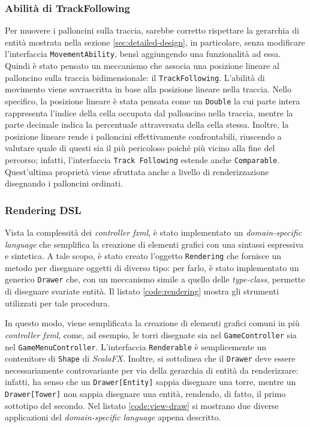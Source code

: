 \subsubsection{Abilità di TrackFollowing}
Per muovere i palloncini sulla traccia, sarebbe corretto rispettare la gerarchia di entità mostrata nella sezione
\ref{sec:detailed-design}, in particolare, senza modificare l'interfaccia \texttt{MovementAbility}, bensì aggiungendo una
funzionalità ad essa. Quindi è stato pensato un meccanismo che associa una posizione lineare al palloncino sulla
traccia bidimensionale: il \texttt{TrackFollowing}. L'abilità di movimento viene sovrascritta in base alla posizione
lineare nella traccia. Nello specifico, la posizione lineare è stata pensata come un \texttt{Double} la cui parte
intera rappresenta l'indice della cella occupata dal palloncino nella traccia, mentre la parte decimale indica la
percentuale attraversata della cella stessa. Inoltre, la posizione lineare rende i palloncini effettivamente confrontabili,
riuscendo a valutare quale di questi sia il più pericoloso poiché più vicino alla fine del percorso;
infatti, l'interfaccia \texttt{Track Following} estende anche \texttt{Comparable}. Quest'ultima proprietà viene sfruttata
anche a livello di renderizzazione disegnando i palloncini ordinati.

\subsubsection{Rendering DSL}
Vista la complessità dei \textit{controller fxml}, è stato implementato un \textit{domain-specific language} che
semplifica la creazione di elementi grafici con una sintassi espressiva e sintetica. A tale scopo, è stato creato
l'oggetto \texttt{Rendering} che fornisce un metodo per disegnare oggetti di diverso tipo: per farlo, è stato
implementato un generico \texttt{Drawer} che, con un meccanismo simile a quello delle \textit{type-class}, permette di
disegnare svariate entità. Il listato \ref{code:rendering} mostra gli strumenti utilizzati per tale procedura.



In questo modo, viene semplificata la creazione di elementi grafici comuni in più \textit{controller fxml}, come, ad
esempio, le torri disegnate sia nel \texttt{GameController} sia nel \texttt{GameMenuController}. L'interfaccia
\texttt{Renderable} è semplicemente un contenitore di \texttt{Shape} di \textit{ScalaFX}. Inoltre, si sottolinea che il
\texttt{Drawer} deve essere necessariamente controvariante per via della gerarchia di entità da renderizzare: infatti,
ha senso che un \texttt{Drawer[Entity]} sappia disegnare una torre, mentre un \texttt{Drawer[Tower]} non sappia
disegnare una entità, rendendo, di fatto, il primo sottotipo del secondo. Nel listato \ref{code:view-draw} si mostrano
due diverse applicazioni del \textit{domain-specific language} appena descritto.




